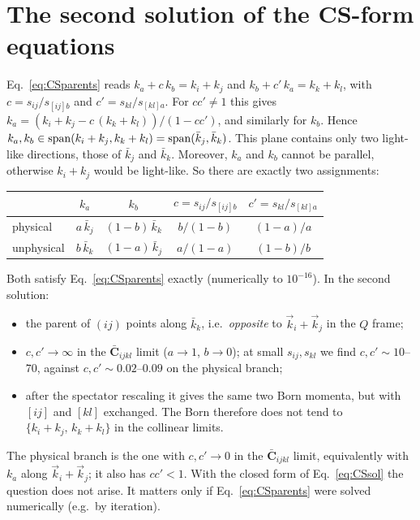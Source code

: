 \documentclass[11pt,a4paper]{article}
\newcommand{\bbC}[1]{\bar{\mathbf C}_{#1}}
\newcommand{\jb}{\bar k_{j}}
\newcommand{\kb}{\bar k_{k}}
\begin{document}
\section{The second solution of the CS-form equations}
\label{app:branch}

Eq.~\eqref{eq:CSparents} reads $k_a+c\,k_b=k_i+k_j$ and $k_b+c'\,k_a=k_k+k_l$, with $c=s_{ij}/s_{[ij]b}$ and $c'=s_{kl}/s_{[kl]a}$.
For $cc'\neq1$ this gives $k_a=(k_i+k_j-c\,(k_k+k_l))/(1-cc')$, and similarly for $k_b$. Hence $k_a,k_b\in{\rm span}(k_i+k_j,k_k+k_l)={\rm span}(\jb,\kb)$.
This plane contains only two light-like directions, those of $\jb$ and $\kb$. Moreover, $k_a$ and $k_b$ cannot be parallel, otherwise $k_i+k_j$ would be light-like.
So there are exactly two assignments:
\begin{center}
\renewcommand{\arraystretch}{1.3}
\begin{tabular}{lcccc}\toprule
& $k_a$ & $k_b$ & $c=s_{ij}/s_{[ij]b}$ & $c'=s_{kl}/s_{[kl]a}$\\\midrule
physical & $a\,\jb$ & $(1-b)\,\kb$ & $b/(1-b)$ & $(1-a)/a$\\
unphysical & $b\,\kb$ & $(1-a)\,\jb$ & $a/(1-a)$ & $(1-b)/b$\\\bottomrule
\end{tabular}
\end{center}
Both satisfy Eq.~\eqref{eq:CSparents} exactly (numerically to $10^{-16}$). In the second solution:
\begin{itemize}
\item the parent of $(ij)$ points along $\kb$, i.e.\ \emph{opposite} to $\vec k_i+\vec k_j$ in the $Q$ frame;
\item $c,c'\to\infty$ in the $\bbC{ijkl}$ limit ($a\to1$, $b\to0$); at small $s_{ij},s_{kl}$ we find $c,c'\sim10$--$70$, against $c,c'\sim0.02$--$0.09$ on the physical branch;
\item after the spectator rescaling it gives the same two Born momenta, but with $[ij]$ and $[kl]$ exchanged. The Born therefore does not tend to
$\{k_i+k_j,\,k_k+k_l\}$ in the collinear limits.
\end{itemize}
The physical branch is the one with $c,c'\to0$ in the $\bbC{ijkl}$ limit, equivalently with $k_a$ along $\vec k_i+\vec k_j$; it also has $cc'<1$.
With the closed form of Eq.~\eqref{eq:CSsol} the question does not arise. It matters only if Eq.~\eqref{eq:CSparents} were solved numerically (e.g.\ by iteration).
\end{document}

